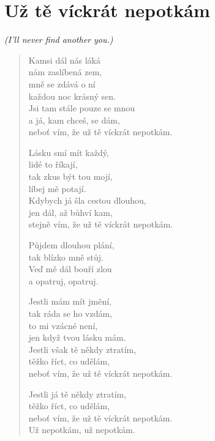 \section*{Už tě víckrát nepotkám}
\textit{(I'll never find another you.)}

\begin{verse}
Kamsi dál nás láká \\
nám zaslíbená zem,\\
mně se zdává o ní\\
každou noc krásný sen.\\
Jsi tam stále pouze se mnou\\
a já, kam chceš, se dám,\\
neboť vím, že už tě víckrát nepotkám.

Lásku smí mít každý, \\
lidé to říkají, \\
tak zkus být tou mojí, \\
líbej mě potají. \\
Kdybych já šla cestou dlouhou, \\
jen dál, až bůhví kam, \\
stejně vím, že už tě víckrát nepotkám.

Půjdem dlouhou plání, \\
tak blízko mně stůj. \\
Veď mě dál bouří zlou \\
a opatruj, opatruj. 

Jestli mám mít jmění, \\
tak ráda se ho vzdám, \\
to mi vzácné není, \\
jen když tvou lásku mám. \\
Jestli však tě někdy ztratím, \\
těžko říct, co udělám, \\
neboť vím, že už tě víckrát nepotkám. 

Jestli já tě někdy ztratím, \\
těžko říct, co udělám, \\
neboť vím, že už tě víckrát nepotkám. \\
Už nepotkám, už nepotkám.
\end{verse}

